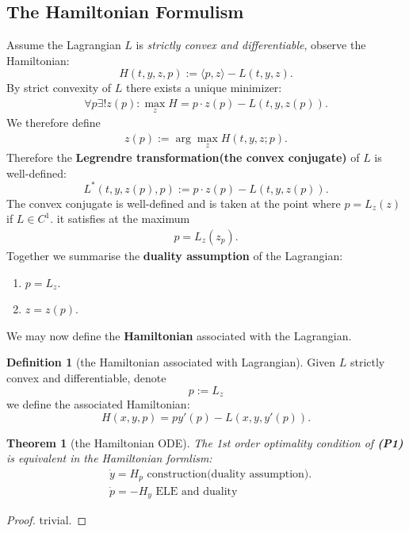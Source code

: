 \documentclass[a4paper,11pt,fleqn]{book}
\newtheorem{theorem}{Theorem}[section]
\theoremstyle{definition}
\newtheorem{definition}{Definition}[section]
\theoremstyle{remark}
\begin{document}
\subsection{The Hamiltonian Formulism}
Assume the Lagrangian $L$ is \textit{strictly convex and differentiable}, observe the Hamiltonian: 
\begin{equation}
	H(t, y, z, p):= \langle p, z \rangle - L(t, y, z).
\end{equation}
By strict convexity of $L$ there exists a unique minimizer:
\begin{align*}
	\forall p \exists! z(p):  \max_z H = p \cdot z(p) - L(t, y, z(p)). 
\end{align*}
We therefore define
\begin{align*}
	z(p):= \arg\max_z H (t, y, z;p). 
\end{align*}
Therefore the \textbf{Legrendre transformation(the convex conjugate)} of $L$ is well-defined:
\begin{equation}
	L^*(t, y, z(p), p) := p \cdot z(p) - L(t, y, z(p)). 
\end{equation}
The convex conjugate is well-defined and is taken at the point where $p = L_z(z)$ if $L \in C^1$. 
 it satisfies at the maximum
\begin{align*}
	p = L_{z}(z_p).
\end{align*}
Together we summarise the \textbf{duality assumption} of the Lagrangian:
\begin{enumerate}
	\item $p = L_{z}$. 
	\item $z = z(p)$.  
\end{enumerate}
We may now define the \textbf{Hamiltonian} associated with the Lagrangian.
\begin{definition}[the Hamiltonian associated with Lagrangian]
	Given $L$ strictly convex and differentiable, denote
	\begin{equation}
		p := L_z
	\end{equation} we define the associated Hamiltonian:
	\begin{equation}
		H(x, y, p) = p y'(p) - L(x, y, y'(p)). 
	\end{equation}
\end{definition}

\begin{theorem}[the Hamiltonian ODE]
	The 1st order optimality condition of \textbf{(P1)} is equivalent in the Hamiltonian formlism:
	\begin{align*}
		& \dot{y} = H_p \text{ construction(duality assumption).}\\
		& \dot{p} = - H_y \text{ ELE and duality}
	\end{align*}
\end{theorem}
\begin{proof}
	trivial.
\end{proof}
\end{document}
